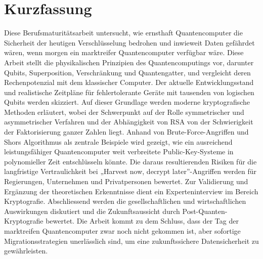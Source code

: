 \chapter*{Kurzfassung}
Diese Berufsmaturitätsarbeit untersucht, wie ernsthaft Quantencomputer die Sicherheit der heutigen Verschlüsselung bedrohen und inwieweit Daten gefährdet wären, wenn morgen ein marktreifer Quantencomputer verfügbar wäre.
Diese Arbeit stellt die physikalischen Prinzipien des Quantencomputings vor, darunter Qubits, Superposition, Verschränkung und Quantengatter, und vergleicht deren Rechenpotenzial mit dem klassischer Computer.
Der aktuelle Entwicklungsstand und realistische Zeitpläne für fehlertolerante Geräte mit tausenden von logischen Qubits werden skizziert. 
Auf dieser Grundlage werden moderne kryptografische Methoden erläutert, wobei der Schwerpunkt auf der Rolle symmetrischer und asymmetrischer Verfahren und der Abhängigkeit von RSA von der Schwierigkeit der Faktorisierung ganzer Zahlen liegt. 
Anhand von Brute-Force-Angriffen und Shors Algorithmus als zentrale Beispiele wird gezeigt, wie ein ausreichend leistungsfähiger Quantencomputer weit verbreitete Public-Key-Systeme in polynomieller Zeit entschlüsseln könnte. 
Die daraus resultierenden Risiken für die langfristige Vertraulichkeit bei „Harvest now, decrypt later”-Angriffen werden für Regierungen, Unternehmen und Privatpersonen bewertet. Zur Validierung und Ergänzung der theoretischen Erkenntnisse dient ein Experteninterview im Bereich Kryptografie.
Abschliessend werden die gesellschaftlichen und wirtschaftlichen Auswirkungen diskutiert und die Zukunftsaussicht durch Post-Quanten-Kryptografie bewertet. 
Die Arbeit kommt zu dem Schluss, dass der Tag der marktreifen Quantencomputer zwar noch nicht gekommen ist, aber sofortige Migrationsstrategien unerlässlich sind, um eine zukunftssichere Datensicherheit zu gewährleisten.
